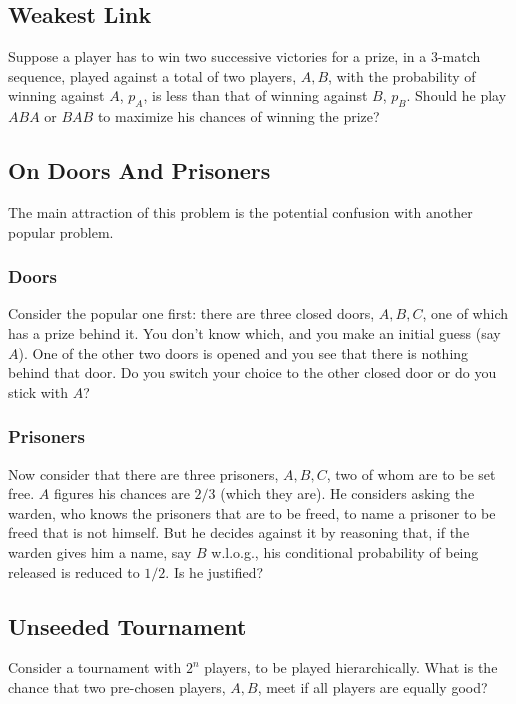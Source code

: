 \documentclass[reqno]{amsart}
\begin{document}
\subsection{Weakest Link}
Suppose a player has to win two successive victories for a prize, in a 3-match sequence, played against a total of two players, $A, B$, with the probability of winning against $A$, $p_A$, is less than that of winning against $B$, $p_B$. Should he play $ABA$ or $BAB$ to maximize his chances of winning the prize?

\subsection{On Doors And Prisoners}
The main attraction of this problem is the potential confusion with another popular problem. 
\subsubsection{Doors}
\noindent Consider the popular one first: there are three closed doors, $A, B, C$, one of which has a prize behind it. You don't know which, and you make an initial guess (say $A$). One of the other two doors is opened and you see that there is nothing behind that door. Do you switch your choice to the other closed door or do you stick with $A$?

\subsubsection{Prisoners}
\noindent Now consider that there are three prisoners, $A, B, C$, two of whom are to be set free. $A$ figures his chances are $2/3$ (which they are). He considers asking the warden, who knows the prisoners that are to be freed, to name a prisoner to be freed that is not himself. But he decides against it by reasoning that, if the warden gives him a name, say $B$ w.l.o.g., his conditional probability of being released is reduced to $1/2$. Is he justified?

\subsection{Unseeded Tournament}
Consider a tournament with $2^n$ players, to be played hierarchically. What is the chance that two pre-chosen players, $A, B$, meet if all players are equally good?
\end{document}
